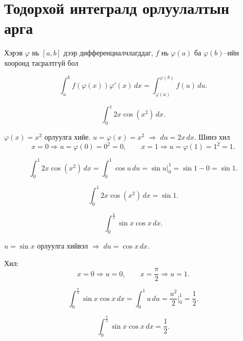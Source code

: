 \section{Тодорхой интегралд орлуулалтын арга}

Хэрэв $\varphi$ нь $[a,b]$ дээр дифференциалчлагддаг, 
$f$ нь $\varphi(a)$ ба $\varphi(b)$--ийн хооронд тасралтгүй бол

\[
\int_a^b f(\varphi(x))\varphi'(x)\,dx
=
\int_{\varphi(a)}^{\varphi(b)} f(u)\,du.
\]
\begin{example}
\[
\int_0^1 2x\cos(x^2)\,dx.
\]

$\varphi(x)=x^2$ орлуулга хийе. \quad $u=\varphi(x)=x^2$ \;\; $\Rightarrow\; du=2x\,dx$.
Шинэ хил  
\[
x=0\Rightarrow u=\varphi(0)=0^2=0,\qquad x=1\Rightarrow u=\varphi(1)=1^2=1.
\]

\[
\int_0^1 2x\cos(x^2)\,dx
=
\int_0^1 \cos u\,du
=
\sin u\Big|_0^1
=\sin1-0=\sin1.
\]

\[
\boxed{\int_0^1 2x\cos(x^2)\,dx=\sin1.}
\]

\end{example}
\begin{example}
\[
\int_0^{\frac{\pi}{2}}\sin x\cos x\,dx.
\]

 $u=\sin x$  орлуулга хийвэл $\Rightarrow\; du=\cos x\,dx$.

Хил:
\[
x=0\Rightarrow u=0,\qquad x=\frac{\pi}{2}\Rightarrow u=1.
\]

\[
\int_0^{\frac{\pi}{2}}\sin x\cos x\,dx
=
\int_0^{1} u\,du
=
\frac{u^2}{2}\Big|_0^1
=\frac12.
\]

\[
\boxed{\displaystyle \int_0^{\frac{\pi}{2}}\sin x\cos x\,dx=\frac12.}
\]

\end{example}
